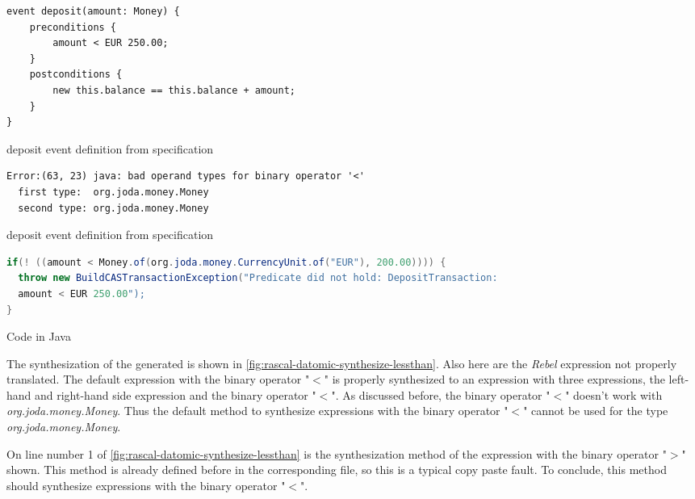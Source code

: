 
\begin{sourcecode}[h!]
\begin{lstlisting}[]
event deposit(amount: Money) {
	preconditions {
		amount < EUR 250.00;
	}
	postconditions {
		new this.balance == this.balance + amount;
	}
}
\end{lstlisting}
\caption{deposit event definition from specification}\label{fig:java-deposit-maxamount}
\end{sourcecode}

\begin{sourcecode}[h!]
\begin{lstlisting}[]
Error:(63, 23) java: bad operand types for binary operator '<'
  first type:  org.joda.money.Money
  second type: org.joda.money.Money
\end{lstlisting}
\caption{deposit event definition from specification}\label{fig:java-result-lessthan-compile-error}
\end{sourcecode}

\begin{sourcecode}[h!]
\begin{lstlisting}[language=Java]
if(! ((amount < Money.of(org.joda.money.CurrencyUnit.of("EUR"), 200.00)))) {
  throw new BuildCASTransactionException("Predicate did not hold: DepositTransaction:
  amount < EUR 250.00");
}
\end{lstlisting}
\caption{Code in Java}\label{fig:java-lessthan-compile-error}
\end{sourcecode}

The synthesization of the generated is shown in
\autoref{fig:rascal-datomic-synthesize-lessthan}. Also here are the \textit{Rebel}
expression not properly translated. The default expression with the binary
operator "$<$" is properly synthesized to an expression with three expressions,
the left-hand and right-hand side expression and the binary operator "$<$".
As discussed before, the binary operator "$<$" doesn't work with
\textit{org.joda.money.Money}. Thus the default method to synthesize expressions
with the binary operator "$<$" cannot be used for the type
\textit{org.joda.money.Money}.

On line number 1 of \autoref{fig:rascal-datomic-synthesize-lessthan} is the
synthesization method of the expression with the binary operator "$>$" shown.
This method is already defined before in the corresponding file, so this is a
typical copy paste fault. To conclude, this method should synthesize expressions
with the binary operator "$<$".

